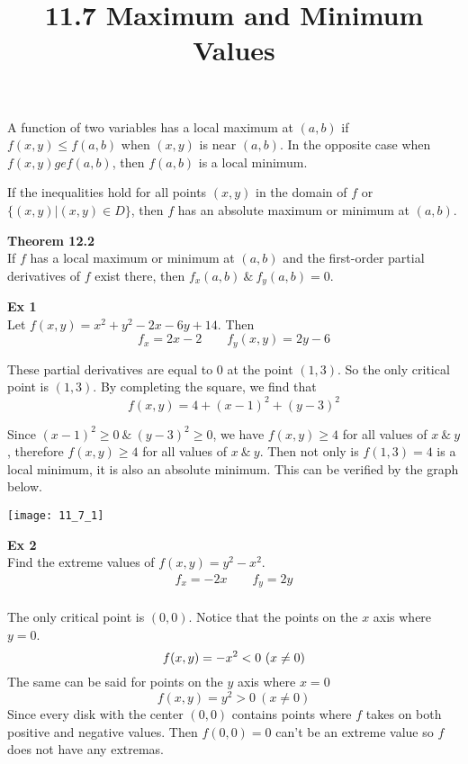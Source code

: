 \documentclass{article}
\title{11.7 Maximum and Minimum Values}
\begin{document}
    \maketitle
    A function of two variables has a local maximum at $ (a,b) $ if $ f(x,y) \le f(a,b) $ when $ (x,y) $ is near $ (a,b) $. In the opposite case when $ f(x,y) ge f(a,b) $, then $ f(a,b) $ is a local minimum.

    If the inequalities hold for all points $ (x,y) $ in the domain of $ f $ or $ \{ (x,y)|(x,y) \in D \} $, then $ f $ has an absolute maximum or minimum at $ (a,b) $.

    \textbf{Theorem 12.2}\\
    If $ f $ has a local maximum or minimum at $ (a,b) $ and the first-order partial derivatives of $ f $ exist there, then $ f_{x}(a,b)  ~\&~ f_{y}(a,b) =0$.

    \textbf{Ex 1}\\
    Let $ f(x,y) =x^{2}+y^{2}-2x-6y+14 $. Then
    \[
        f_{x}=2x-2 \qquad f_{y}(x,y)=2y-6  
    \]

    These partial derivatives are equal to $ 0 $ at the point $ (1,3) $. So the only critical point is $ (1,3) $. By completing the square, we find that
    \[
        f(x,y)=4+(x-1)^{2}+(y-3)^{2}  
    \]

    Since $ (x-1)^{2} \ge 0 ~\&~ (y-3)^{2} \ge 0 $, we have $ f(x,y) \ge 4 $ for all values of $ x ~\&~ y $, therefore $ f(x,y) \ge 4$ for all values of $ x ~\&~ y $. Then not only is $ f(1,3)=4 $ is a local minimum, it is also an absolute minimum. This can be verified by the graph below.
    \begin{center}
        \texttt{[image: 11\_7\_1]}
    \end{center}
    
    \textbf{Ex 2}\\
    Find the extreme values of $ f(x,y)=y^{2}-x^{2}. $
    \[
        \begin{gathered}
        f_{x}=-2x \qquad f_{y}=2y\\
        \end{gathered}
    \]
    
    The only critical point is $ (0,0) $. Notice that the points on the $ x $  axis where $ y=0 $. 
    \[
        f(x,y)=-x^{2}<0~(x\neq 0)\\ 
    \]
    The same can be said for points on the $ y $ axis where $ x=0 $
    \[
        f(x,y)=y^{2}>0~(x\neq 0) 
    \]
    Since every disk with the center $ (0,0) $ contains points where $ f $ takes on both positive and negative values. Then $ f(0,0)=0 $ can't be an extreme value so $ f $ does not have any extremas.
    
    
    
\end{document}
